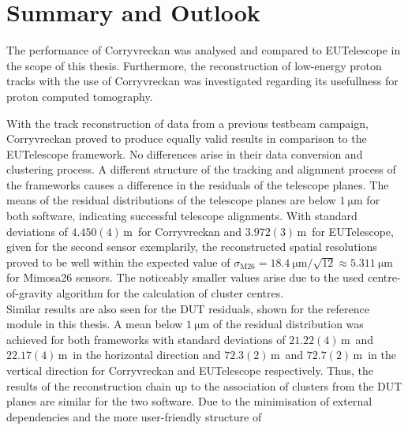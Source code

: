 \chapter{Summary and Outlook}
The performance of Corryvreckan was analysed and compared to EUTelescope in the scope of this thesis. Furthermore, the reconstruction of low-energy proton
tracks with the use of Corryvreckan was investigated regarding its usefullness for proton computed tomography.

With the track reconstruction of data from a previous testbeam campaign, Corryvreckan proved to
produce equally valid results in comparison to the EUTelescope framework. No differences
arise in their data conversion and clustering process.
A different structure of the tracking and alignment process of the frameworks causes a difference in the residuals
of the telescope planes. The means of the residual distributions of the telescope planes
are below $\SI{1}{\micro\meter}$ for both software, indicating successful telescope alignments.
With standard deviations of $4.450(4)$\,\textmu m\, for Corryvreckan and $3.972(3)$\,\textmu m\, for EUTelescope, given for the second sensor exemplarily, the
reconstructed spatial resolutions proved to be well within
the expected value of $\sigma_{\text{M26}} = \SI{18.4}{\micro\meter}/\sqrt{12} \approx \SI{5.311}{\micro\meter}$ for Mimosa26 sensors. The noticeably smaller values
arise due to the used centre-of-gravity algorithm for the calculation of cluster centres. \\
Similar results are also seen for the DUT residuals, shown for the reference module in this thesis.
A mean below $\SI{1}{\micro\meter}$ of the residual distribution was achieved for both frameworks with standard deviations of $21.22(4)$\,\textmu m\, and $22.17(4)$\,\textmu m\, in the horizontal direction and
$72.3(2)$\,\textmu m\, and $72.7(2)$\,\textmu m\, in the vertical direction for Corryvreckan and EUTelescope respectively.
Thus, the results of the reconstruction chain up to the
association of clusters from the DUT planes are similar for the two software. Due to the minimisation of external dependencies and the more user-friendly structure of
